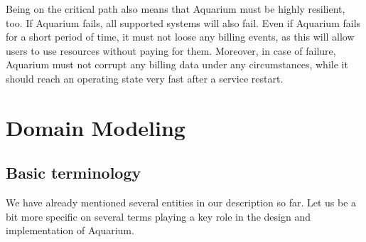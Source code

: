 \documentclass[preprint,10pt]{sigplanconf}
\begin{document}
Being on the critical path also means that Aquarium must be highly resilient,
too. If Aquarium fails, all supported systems will also fail. Even if Aquarium
fails for a short period of time, it must not loose any billing events, as this
will allow users to use resources without paying for them. Moreover, in case of
failure, Aquarium must not corrupt any billing data under any circumstances,
while it should reach an operating state very fast after a service restart.

\section{Domain Modeling}

\subsection{Basic terminology}
We have already mentioned several entities in our description so far. Let us be a bit more specific on several terms playing a key role in the design and implementation of Aquarium.
\end{document}

